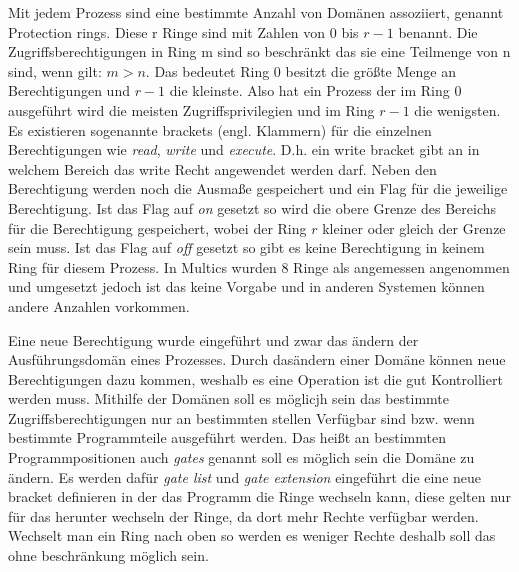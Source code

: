 \documentclass[11pt,technote]{IEEEtran}
\begin{document}
        Mit jedem Prozess sind eine bestimmte Anzahl von Dom\"anen assoziiert, genannt Protection rings. Diese r Ringe sind mit Zahlen von $0$ bis $r - 1$ benannt.
        Die Zugriffsberechtigungen in Ring m sind so beschr\"ankt das sie eine Teilmenge von n sind, wenn gilt: $m > n$. Das bedeutet
        Ring $0$ besitzt die gr\"o\ss te Menge an Berechtigungen und $r-1$ die kleinste. Also hat ein Prozess der im Ring $0$ ausgef\"uhrt wird
        die meisten Zugriffsprivilegien und im Ring $r-1$ die wenigsten. Es existieren sogenannte brackets (engl. Klammern) f\"ur die einzelnen Berechtigungen
        wie \textit{read}, \textit{write} und \textit{execute}. D.h. ein write bracket gibt an in welchem Bereich das write Recht angewendet werden darf. Neben den 
        Berechtigung werden noch die Ausma\ss e gespeichert und ein Flag f\"ur die jeweilige Berechtigung. Ist das Flag auf \textit{on} gesetzt 
        so wird die obere Grenze des Bereichs f\"ur die Berechtigung gespeichert, wobei der Ring $r$ kleiner oder gleich der Grenze sein muss.
        Ist das Flag auf \textit{off} gesetzt so gibt es keine Berechtigung in keinem Ring f\"ur diesem Prozess. In Multics wurden 8 Ringe als angemessen 
        angenommen und umgesetzt jedoch ist das keine Vorgabe und in anderen Systemen k\"onnen andere Anzahlen vorkommen.
    
        Eine neue Berechtigung wurde eingef\"uhrt und zwar das \"andern der Ausf\"uhrungsdom\"an eines Prozesses.
        Durch das\"andern einer Dom\"ane k\"onnen neue Berechtigungen dazu kommen, weshalb es eine Operation ist die gut Kontrolliert werden muss.
        Mithilfe der Dom\"anen soll es m\"oglicjh sein das bestimmte Zugriffsberechtigungen nur an bestimmten stellen Verf\"ugbar  sind bzw. wenn bestimmte Programmteile 
        ausgef\"uhrt werden. Das hei\ss t an bestimmten Programmpositionen auch \textit{gates} genannt soll es m\"oglich sein die Dom\"ane zu \"andern.
        Es werden daf\"ur \textit{gate list} und \textit{gate extension} eingef\"uhrt die eine neue bracket definieren in der das Programm die Ringe wechseln kann, diese
        gelten nur f\"ur das herunter wechseln der Ringe, da dort mehr Rechte verf\"ugbar werden. Wechselt man ein Ring nach oben so werden es weniger Rechte deshalb
        soll das ohne beschr\"ankung m\"oglich sein. 
    
    
\end{document}
